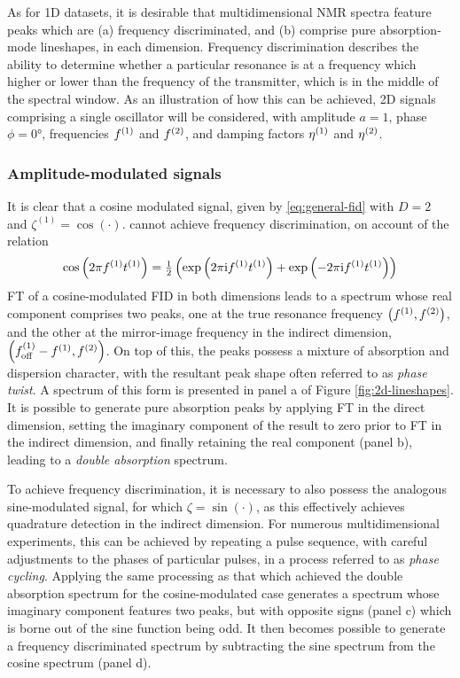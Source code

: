 As for \ac{1D} datasets, it is desirable that multidimensional \ac{NMR} spectra
feature peaks which are (a) frequency discriminated, and (b) comprise pure
absorption-mode lineshapes, in each dimension. Frequency discrimination describes
the ability to determine whether a particular resonance is at a frequency which
higher or lower than the frequency of the transmitter, which is in the middle
of the spectral window. As an illustration of how this can be achieved, \ac{2D}
signals comprising a single oscillator will be considered, with
amplitude $a = 1$,  phase $\phi = \ang{0}$, frequencies $f^{(1)}$ and $f^{(2)}$, and
damping factors $\eta^{(1)}$ and  $\eta^{(2)}$.

\subsubsection{Amplitude-modulated signals}
It is clear that a cosine modulated signal, given by \eqref{eq:general-fid}
with $D=2$ and $\zeta^{(1)} = \cos(\cdot)$. cannot achieve frequency
discrimination, on account of the relation
\begin{equation}
    \cos\left(2 \pi f^{(1)} t^{(1)}\right) =
    \tfrac{1}{2} \left(\exp\left(2 \pi \mathrm{i} f^{(1)} t^{(1)} \right) + \exp\left(-2 \pi \mathrm{i}
    f^{(1)} t^{(1)} \right)\right)
\end{equation}
\ac{FT} of a cosine-modulated \ac{FID} in both dimensions leads to a spectrum
whose real component comprises two peaks, one at the true resonance frequency
$\left(f^{(1)}, f^{(2)}\right)$, and the other at the mirror-image frequency in the
indirect dimension, $\left(f_{\mathrm{off}}^{(1)} - f^{(1)}, f^{(2)}\right)$. On top of this, the
peaks possess a mixture of absorption and dispersion character, with the
resultant peak shape often referred to as \emph{phase twist}\cite{Keeler1985}.
A spectrum of this form is presented in panel a of Figure \ref{fig:2d-lineshapes}.
It is possible to generate pure absorption peaks by applying \ac{FT} in the
direct dimension, setting the imaginary component of the result to zero
prior to \ac{FT} in the indirect dimension, and finally retaining the real
component (panel b), leading to a \emph{double absorption} spectrum.

To achieve frequency discrimination, it is necessary to also possess the
analogous sine-modulated signal, for which $\zeta = \sin(\cdot)$, as this
effectively achieves quadrature detection in the indirect dimension. For
numerous multidimensional experiments, this can be achieved by repeating a
pulse sequence, with careful adjustments to the phases of particular pulses, in
a process referred to as \emph{phase cycling}. Applying
the same processing as that which achieved the double absorption spectrum for
the cosine-modulated case generates a spectrum whose imaginary component
features two peaks, but with opposite signs (panel c) which is borne out of the
sine function being odd. It then becomes possible to generate a frequency
discriminated spectrum by subtracting the sine spectrum from the cosine
spectrum (panel d).

